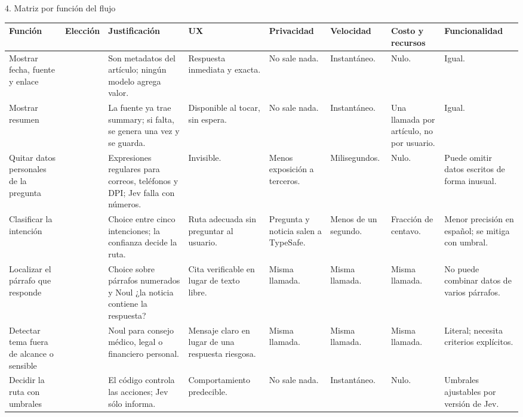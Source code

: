 \documentclass{article}
\newcommand{\etq}[3]{\tcbox[on line,colback=#2,colframe=#2,coltext=white,boxsep=1pt,left=4pt,right=4pt,top=1pt,bottom=1pt,arc=3pt]{#1}}
\newcommand{\JEV}{\etq{JEV}{jev}{}}
\newcommand{\CODE}{\etq{CODE}{code}{}}
\newcommand{\HP}{\etq{Proveedor}{jev}{}}
\begin{document}
\begin{panel}{4. Matriz por función del flujo}
\renewcommand{\arraystretch}{1.35}
\fontsize{14}{18}\selectfont
\begin{tabularx}{\linewidth}{@{}>{\raggedright}p{75mm}>{\centering}p{25mm}>{\raggedright}X>{\raggedright}p{88mm}>{\raggedright}p{80mm}>{\raggedright}p{58mm}>{\raggedright}p{70mm}>{\raggedright\arraybackslash}p{88mm}@{}}
{\color{gris}Función} & {\color{gris}Elección} & {\color{gris}Justificación} & {\color{gris}UX} & {\color{gris}Privacidad} & {\color{gris}Velocidad} & {\color{gris}Costo y recursos} & {\color{gris}Funcionalidad} \\\hline
Mostrar fecha, fuente y enlace & \CODE & Son metadatos del artículo; ningún modelo agrega valor. & Respuesta inmediata y exacta. & No sale nada. & Instantáneo. & Nulo. & Igual. \\\hline
Mostrar resumen & \CODE & La fuente ya trae summary; si falta, se genera una vez y se guarda. & Disponible al tocar, sin espera. & No sale nada. & Instantáneo. & Una llamada por artículo, no por usuario. & Igual. \\\hline
Quitar datos personales de la pregunta & \CODE & Expresiones regulares para correos, teléfonos y DPI; Jev falla con números. & Invisible. & Menos exposición a terceros. & Milisegundos. & Nulo. & Puede omitir datos escritos de forma inusual. \\\hline
Clasificar la intención & \JEV & Choice entre cinco intenciones; la confianza decide la ruta. & Ruta adecuada sin preguntar al usuario. & Pregunta y noticia salen a TypeSafe. & Menos de un segundo. \HP & Fracción de centavo. & Menor precisión en español; se mitiga con umbral. \\\hline
Localizar el párrafo que responde & \JEV & Choice sobre párrafos numerados y Noul ¿la noticia contiene la respuesta? & Cita verificable en lugar de texto libre. & Misma llamada. & Misma llamada. & Misma llamada. & No puede combinar datos de varios párrafos. \\\hline
Detectar tema fuera de alcance o sensible & \JEV & Noul para consejo médico, legal o financiero personal. & Mensaje claro en lugar de una respuesta riesgosa. & Misma llamada. & Misma llamada. & Misma llamada. & Literal; necesita criterios explícitos. \\\hline
Decidir la ruta con umbrales & \CODE & El código controla las acciones; Jev sólo informa. & Comportamiento predecible. & No sale nada. & Instantáneo. & Nulo. & Umbrales ajustables por versión de Jev. \\\hline

\end{tabularx}
\end{panel}
\end{document}
